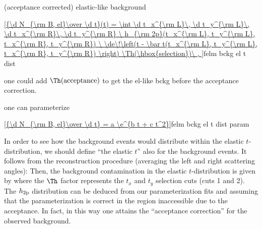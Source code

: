 \> (acceptance corrected) elastic-like background

\eqref{{\d N_{\rm B, el}\over \d t}(t) = \int
	\d t_x^{\rm L}\, \d t_y^{\rm L}\, \d t_x^{\rm R}\, \d t_y^{\rm R}
	\ h_{\rm 2p}(t_x^{\rm L}, t_y^{\rm L}, t_x^{\rm R}, t_y^{\rm R})
	\ \de\!\left(t - \bar t(t_x^{\rm L}, t_y^{\rm L}, t_x^{\rm R}, t_y^{\rm R}) \right)
	\Th(\hbox{selection})\ ,
}{felm bckg el t dist}

\> one could add $\Th(\hbox{acceptance})$ to get the el-like bckg before the acceptance correction.

\> one can parameterize

\eqref{{\d N_{\rm B, el}\over \d t} = a \e^{b t + c t^2}}{felm bckg el t dist param}


\bmfig
{}
\emfig

\iffalse
In order to see how the background events would distribute within the elastic $t$-distribution, we should define ``the elastic $t$'' also for the background events. It follows from the reconstruction procedure (averaging the left and right scattering angles):
Then, the background contamination in the elastic $t$-distribution is given by
where the $\Th$ factor represents the $t_x$ and $t_y$ selection cuts (cuts 1 and 2). The $h_{\rm 2p}$ distribution can be deduced from our parameterization  fits and assuming that the parameterization is correct in the region inaccessible due to the acceptance. In fact, in this way one attains the ``acceptance correction'' for the observed background.

